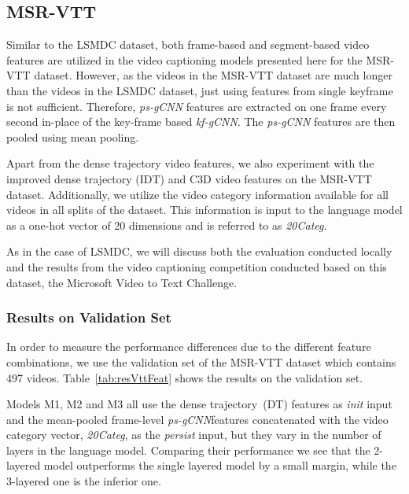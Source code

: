 \subsection{MSR-VTT}
Similar to the LSMDC dataset, both frame-based and segment-based video
features are utilized in the video captioning models presented here for the MSR-VTT dataset.
However, as the videos in the MSR-VTT dataset are much longer than the videos in
the LSMDC dataset, just using features from single keyframe is not sufficient.
Therefore, \emph{ps-gCNN} features are extracted on one frame every second
in-place of the key-frame based \emph{kf-gCNN}.
The \emph{ps-gCNN} features are then pooled using mean pooling.

Apart from the dense trajectory video features, we also experiment with the
improved dense trajectory (IDT) and C3D video features on the MSR-VTT dataset.
Additionally, we utilize the video category information available for all videos
in all splits of the dataset.
This information is input to the language model as a one-hot vector of 20
dimensions and is referred to as \emph{20Categ}.

As in the case of LSMDC, we will discuss both the evaluation conducted locally
and the results from the video captioning competition conducted based on this
dataset, the Microsoft Video to Text Challenge.

\subsubsection{Results on Validation Set}
In order to measure the performance differences due to the different feature
combinations, we use the validation set of the MSR-VTT
dataset which contains 497 videos.
Table~\ref{tab:resVttFeat} shows the results on the validation set.

Models M1, M2 and M3 all use the dense trajectory~(DT) features as \emph{init}
input and the mean-pooled frame-level \emph{ps-gCNN}features concatenated with
the video category vector, \emph{20Categ}, as the \emph{persist} input, but they
vary in the number of layers in the language model.
Comparing their performance we see that the 2-layered model outperforms the single
layered model by a small margin, while the 3-layered one is the inferior one.

